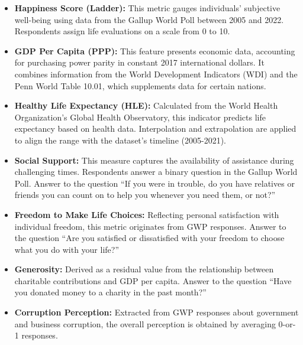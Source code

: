                 \begin{itemize}

                        \item \textbf{Happiness Score (Ladder):} This metric gauges individuals' subjective well-being using data from the Gallup World Poll between 2005 and 2022. Respondents assign life evaluations on a scale from 0 to 10.

                        \item \textbf{GDP Per Capita (PPP):} This feature presents economic data, accounting for purchasing power parity in constant 2017 international dollars. It combines information from the World Development Indicators (WDI) and the Penn World Table 10.01, which supplements data for certain nations.

                        \item \textbf{Healthy Life Expectancy (HLE):} Calculated from the World Health Organization's Global Health Observatory, this indicator predicts life expectancy based on health data. Interpolation and extrapolation are applied to align the range with the dataset's timeline (2005-2021).

                        \item \textbf{Social Support:} This measure captures the availability of assistance during challenging times. Respondents answer a binary question in the Gallup World Poll. Answer to the question ``If you were in trouble, do you have relatives or friends you can count on to help you whenever you need them, or not?''

                        \item \textbf{Freedom to Make Life Choices:} Reflecting personal satisfaction with individual freedom, this metric originates from GWP responses. Answer to the question ``Are you satisfied or dissatisfied with your freedom to choose what you do with your life?''

                        \item \textbf{Generosity:} Derived as a residual value from the relationship between charitable contributions and GDP per capita. Answer to the question ``Have you donated money to a charity in the past month?''

                        \item \textbf{Corruption Perception:} Extracted from GWP responses about government and business corruption, the overall perception is obtained by averaging 0-or-1 responses.


\end{itemize}
